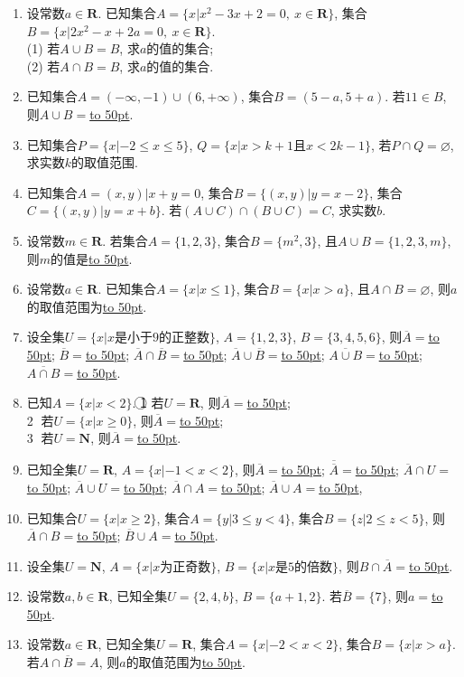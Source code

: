 \documentclass[10pt,a4paper]{article}
\newcommand{\blank}[1]{\underline{\hbox to #1pt{}}}
\begin{document}
\begin{enumerate}[1.]
\item 设常数$a\in \mathbf{R}$. 已知集合$A=\{x|x^2-3x+2=0, \ x\in\mathbf{R}\}$, 集合$B=\{x|2x^2-x+2a=0,\  x\in\mathbf{R}\}$.\\ (1) 若$A\cup B=B$, 求$a$的值的集合;\\
(2) 若$A\cap B=B$, 求$a$的值的集合.
\item 已知集合$A=(-\infty, -1)\cup(6, +\infty)$, 集合$B=(5-a, 5+a)$. 若$11\in B$, 则$A\cup B=$\blank{50}.
\item 已知集合$P=\{ x|-2\le x\le 5\}$, $Q=\{x|x>k+1$且$x<2k-1\}$, 若$P\cap Q=\varnothing$, 求实数$k$的取值范围.
\item 已知集合$A={(x, y)|x+y=0}$, 集合$B=\{(x,y)|y=x-2\}$, 集合$C=\{(x,y)|y=x+b\}$. 若$(A\cup C)\cap(B\cup C)=C$, 求实数$b$.
\item 设常数$m\in \mathbf{R}$. 若集合$A=\{1,2,3\}$, 集合$B=\{m^2,3\}$, 且$A\cup B=\{1,2,3,m\}$, 则$m$的值是\blank{50}.
\item 设常数$a\in \mathbf{R}$. 已知集合$A=\{x| x\le 1\}$, 集合$B=\{x| x>a\}$, 且$A\cap B=\varnothing$, 则$a$的取值范围为\blank{50}.
\item 设全集$U=\{x|x\text{是小于}9\text{的正整数}\}$, $A=\{1,2,3\}$, $B=\{3,4,5,6\}$, 则$\overline A=$\blank{50}; $\overline B=$\blank{50}; $\overline A\cap\overline B=$\blank{50}; $
\overline A\cup\overline B=$\blank{50}; $\overline{A\cup B}=$\blank{50}; $\overline{A\cap B}=$\blank{50}.
\item 已知$A=\{x|x<2\}$.
\textcircled{1} 若$U=\mathbf{R}$, 则$\overline A=$\blank{50};\\
\textcircled{2} 若$U=\{x|x\ge 0\}$, 则$\overline A=$\blank{50};\\
\textcircled{3} 若$U= \mathbf{N}$, 则$\overline A=$\blank{50}.
\item 已知全集$U=\mathbf{R}$, $A=\{x|-1<x<2\}$, 则$\overline A=$\blank{50}; $\overline{\overline A}=$\blank{50}; $\overline A\cap U=$\blank{50}; $\overline A\cup U=$\blank{50}; $\overline A\cap A=$\blank{50}; $\overline A\cup A=$\blank{50},
\item 已知集合$U=\{x|x\ge 2\}$, 集合$A=\{y|3\le y<4\}$, 集合$B=\{z|2\le z<5\}$, 则$\overline A\cap B=$\blank{50}; $\overline B\cup A=$\blank{50}.
\item 设全集$U=\mathbf{N}$, $A=\{x|x\text{为正奇数}\}$, $B=\{x|x\text{是}5\text{的倍数}\}$, 则$B\cap\overline A=$\blank{50}.
\item 设常数$a,b\in \mathbf{R}$, 已知全集$U=\{2, 4, b\}$, $B=\{a+1, 2\}$.  若$\overline B=\{7\}$, 则$a=$\blank{50}.
\item 设常数$a\in \mathbf{R}$, 已知全集$U=\mathbf{R}$, 集合$A=\{x|-2<x<2\}$, 集合$B=\{x|x>a\}$. 若$A\cap\overline B=A$, 则$a$的取值范围为\blank{50}.

\end{enumerate}
\end{document}
